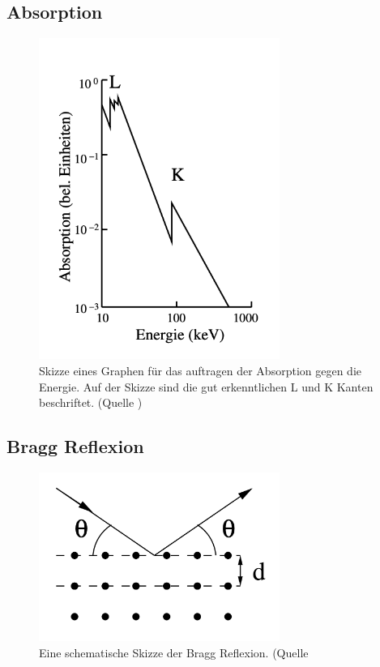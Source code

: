 \subsection{Absorption}
\begin{figure}
    \centering
    \includegraphics[width=0.7\textwidth]{bilder/Absorption.png}
    \caption{Skizze eines Graphen für das auftragen der Absorption gegen die Energie. Auf der Skizze sind die gut erkenntlichen L und K Kanten beschriftet. (Quelle \cite{Anleitung})}
    \label{fig:Absorption}
\end{figure}

\subsection{Bragg Reflexion}
\begin{figure}
    \centering
    \includegraphics[width=0.7\textwidth]{bilder/Bragg_Reflexion.png}
    \caption{Eine schematische Skizze der Bragg Reflexion. (Quelle \cite{Anleitung}}
    \label{fig:Bragg_Reflexion}
\end{figure}
